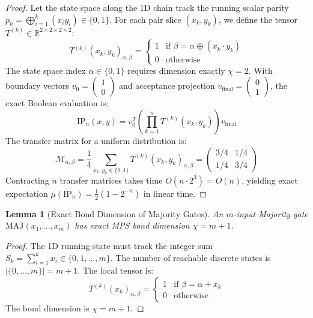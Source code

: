 \documentclass[11pt,letterpaper]{article}
\newtheorem{lemma}[theorem]{Lemma}
\newcommand{\R}{\mathbb{R}}
\begin{document}
\begin{proof}
Let the state space along the 1D chain track the running scalar parity $p_k = \bigoplus_{i=1}^k (x_i y_i) \in \{0,1\}$. 
For each pair slice $(x_k, y_k)$, we define the tensor $T^{(k)} \in \R^{2 \times 2 \times 2 \times 2}$:
\[
T^{(k)}(x_k, y_k)_{\alpha, \beta} = \begin{cases} 
1 & \text{if } \beta = \alpha \oplus (x_k \cdot y_k) \\ 
0 & \text{otherwise} 
\end{cases}
\]
The state space index $\alpha \in \{0,1\}$ requires dimension exactly $\chi = 2$. With boundary vectors $v_0 = \begin{pmatrix} 1 \\ 0 \end{pmatrix}$ and acceptance projection $v_{\text{final}} = \begin{pmatrix} 0 \\ 1 \end{pmatrix}$, the exact Boolean evaluation is:
\[
\mathrm{IP}_n(x, y) = v_0^T \left( \prod_{k=1}^n T^{(k)}(x_k, y_k) \right) v_{\text{final}}
\]
The transfer matrix for a uniform distribution is:
\[
\mathcal{M}_{\alpha, \beta} = \frac{1}{4} \sum_{x_k, y_k \in \{0,1\}} T^{(k)}(x_k, y_k)_{\alpha, \beta} = \begin{pmatrix} 3/4 & 1/4 \\ 1/4 & 3/4 \end{pmatrix}
\]
Contracting $n$ transfer matrices takes time $O(n \cdot 2^3) = O(n)$, yielding exact expectation $\mu(\mathrm{IP}_n) = \frac{1}{2}(1 - 2^{-n})$ in linear time.
\end{proof}

\begin{lemma}[Exact Bond Dimension of Majority Gates]
\label{lem:maj_bond}
An $m$-input Majority gate $\mathrm{MAJ}(x_1, \dots, x_m)$ has exact MPS bond dimension $\chi = m + 1$.
\end{lemma}

\begin{proof}
The 1D running state must track the integer sum $S_k = \sum_{i=1}^k x_i \in \{0, 1, \dots, m\}$. The number of reachable discrete states is $| \{0, \dots, m\} | = m + 1$. The local tensor is:
\[
T^{(k)}(x_k)_{\alpha, \beta} = \begin{cases} 
1 & \text{if } \beta = \alpha + x_k \\ 
0 & \text{otherwise} 
\end{cases}
\]
The bond dimension is $\chi = m + 1$.
\end{proof}
\end{document}
